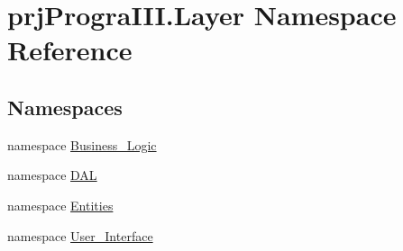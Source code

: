 \hypertarget{namespaceprj_progra_i_i_i_1_1_layer}{}\section{prj\+Progra\+I\+I\+I.\+Layer Namespace Reference}
\label{namespaceprj_progra_i_i_i_1_1_layer}
\subsection*{Namespaces}
\begin{DoxyCompactItemize}
\item 
namespace \hyperlink{namespaceprj_progra_i_i_i_1_1_layer_1_1_business___logic}{Business\+\_\+\+Logic}
\item 
namespace \hyperlink{namespaceprj_progra_i_i_i_1_1_layer_1_1_d_a_l}{D\+AL}
\item 
namespace \hyperlink{namespaceprj_progra_i_i_i_1_1_layer_1_1_entities}{Entities}
\item 
namespace \hyperlink{namespaceprj_progra_i_i_i_1_1_layer_1_1_user___interface}{User\+\_\+\+Interface}
\end{DoxyCompactItemize}
